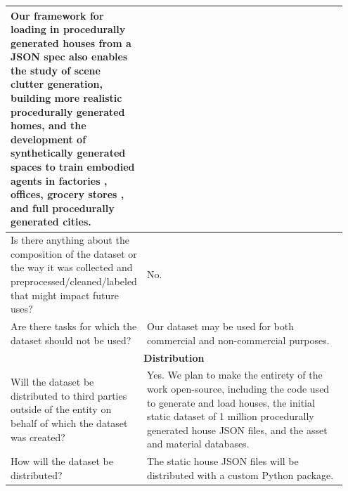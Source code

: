 \begin{longtable}{p{0.35\linewidth} |p{0.6\linewidth} }
    Our framework for loading in procedurally generated houses from a JSON spec also enables the study of scene clutter generation, building more realistic procedurally generated homes, and the development of synthetically generated spaces to train embodied agents in factories \cite{narang2022factory}, offices, grocery stores \cite{mata2022standardsim}, and full procedurally generated cities.\\[0.15in]
    \midrule
    Is there anything about the composition of the dataset or the way it was collected and preprocessed/cleaned/labeled that might impact future uses? & No.\\[0.15in]
    \midrule
    Are there tasks for which the dataset should not be used? & Our dataset may be used for both commercial and non-commercial purposes.\\
    \bottomrule
        \multicolumn{2}{c}{\rule{0in}{0.2in}\textbf{Distribution}\vspace{0.10in}}\\
    \toprule
    Will the dataset be distributed to third parties outside of the entity on behalf of which the dataset was created? & Yes. We plan to make the entirety of the work open-source, including the code used to generate and load houses, the initial static dataset of 1 million procedurally generated house JSON files, and the asset and material databases.\\[0.15in]
    \midrule
    How will the dataset be distributed? & The static house JSON files will be distributed with a custom Python package.\newline
    

\end{longtable}
